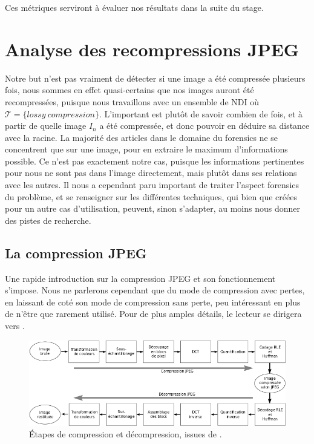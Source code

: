 \documentclass[utf8,final]{stageM2R} %
\begin{document}
Ces métriques serviront à évaluer nos résultats dans la suite du stage.

\section{Analyse des recompressions JPEG}
\label{detail_jpeg}
Notre but n'est pas vraiment de détecter si une image a été compressée plusieurs fois, nous sommes en effet quasi-certains que nos images auront été recompressées, puisque nous travaillons avec un ensemble de NDI où $\mathcal{T} = {\{lossy\ compression\}}$. L'important est plutôt de savoir combien de fois, et à partir de quelle image $I_{n}$ a été compressée, et donc pouvoir en déduire sa distance avec la racine. La majorité des articles dans le domaine du forensics ne se concentrent que sur une image, pour en extraire le maximum d'informations possible. Ce n'est pas exactement notre cas, puisque les informations pertinentes pour nous ne sont pas dans l'image directement, mais plutôt dans ses relations avec les autres. Il nous a cependant paru important de traiter l'aspect forensics du problème, et se renseigner sur les différentes techniques, qui bien que créées pour un autre cas d'utilisation, peuvent, sinon s'adapter, au moins nous donner des pistes de recherche.

\subsection{La compression JPEG}
Une rapide introduction sur la compression JPEG et son fonctionnement s'impose. Nous ne parlerons cependant que du mode de compression avec pertes, en laissant de coté son mode de compression sans perte, peu intéressant en plus de n'être que rarement utilisé. Pour de plus amples détails, le lecteur se dirigera vers \autocite{wallace1992jpeg}.

\begin{figure}[H]
  \begin{center}
    \includegraphics[width=120mm]{images/jpeg.png}
    \caption{Étapes de compression et décompression, issues de \autocite{jpeg}.}
    \label{fig:jpeg}
  \end{center}
\end{figure}
\end{document}
